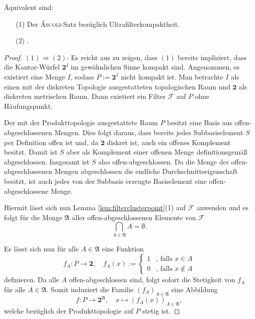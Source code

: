 \begin{thm}
  \label{thm:ultrafiltercompact}
  Äquivalent sind:
  \begin{enumerate}
    \item[(1)] Der \textsc{Áscoli}-Satz bezüglich Ultrafilterkompaktheit.
    \item[(2)] \PIT.
  \end{enumerate}
\end{thm}

\begin{proof}
  $(1)\Rightarrow(2) $: Es reicht aus zu zeigen, dass $(1)$ bereits impliziert, dass die Kantor-Würfel $\mathbf{2}^I$ im gewöhnlichen Sinne kompakt sind.
  Angenommen, es existiert eine Menge $I$, sodass $P:= \mathbf{2}^I$ nicht kompakt ist.
  Man betrachte $I$ als einen mit der diskreten Topologie ausgestatteten topologischen Raum und $\mathbf{2}$ als diskreten metrischen Raum.
  Dann existiert ein Filter $\mathcal{F}$ auf $P$ ohne Häufungspunkt.

  Der mit der Produkttopologie ausgestattete Raum $P$ besitzt eine Basis aus offen-ab\-ge\-schlossenen Mengen.
  Dies folgt daraus, dass bereits jedes Subbasiselement $S$ per Definition offen ist und, da $\mathbf{2}$ diskret ist, auch ein offenes Komplement besitzt.
  Damit ist $S$ aber als Komplement einer offenen Menge definitionsgemäß abgeschlossen.
  Insgesamt ist $S$ also offen-abgeschlossen.
  Da die Menge der offen-abgeschlossenen Mengen abgeschlossen die endliche Durchschnittseigenschaft besitzt, ist auch jedes von der Subbasis erzeugte Basiselement eine offen-abgeschlossene Menge.

  Hiermit lässt sich nun Lemma \ref{lem:filterclusterpoint}(1) auf $\mathcal{F}$ anwenden und es folgt für die Menge $\mathfrak{A}$ aller offen-abgeschlossenen Elemente von $\mathcal{F}$
  \begin{displaymath}
    \bigcap_{A \in \mathfrak{A}} A = \emptyset \tag{$\ast$}.
  \end{displaymath}

  Es lässt sich nun für alle $A \in \mathfrak{A}$ eine Funktion
  \begin{equation}
    \label{eq:clopenmap}
    f_A \colon P \to \mathbf{2}, \quad
    f_A(x) := 
    \begin{cases}
      1 &\text{, falls } x \in A \\
      0 &\text{, falls } x \not\in A
    \end{cases}
  \end{equation}
  definieren.
  Da alle $A$ offen-abgeschlossen sind, folgt sofort die Stetigkeit von $f_A$ für alle $A \in \mathfrak{A}$.
  Somit induziert die Familie $(f_A)_{A \in \mathfrak{A}}$ eine Abbildung 
  \begin{displaymath}
    f \colon P \to \mathbf{2}^\mathfrak{A}, \quad
    x \mapsto (f_A(x))_{A \in \mathfrak{A}},
  \end{displaymath}
  welche bezüglich der Produkttopologie auf $P$ stetig ist.


\end{proof}
